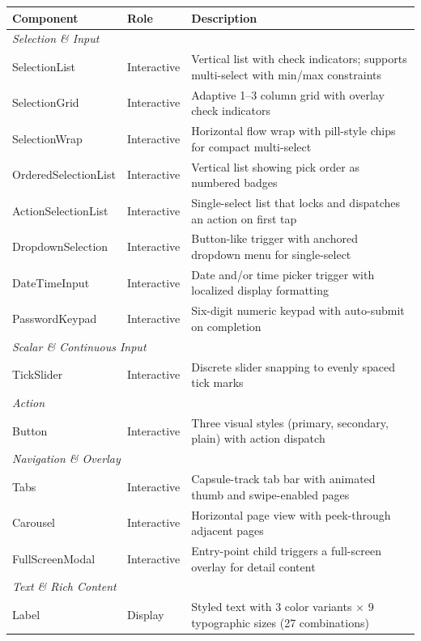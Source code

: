 \begin{table}[h]
\centering

\small
\begin{tabular}{llp{7.2cm}}
\toprule
\textbf{Component} & \textbf{Role} & \textbf{Description} \\
\midrule
\multicolumn{3}{l}{\textit{Selection \& Input}} \\
SelectionList & Interactive & Vertical list with check indicators; supports multi-select with min/max constraints \\
SelectionGrid & Interactive & Adaptive 1--3 column grid with overlay check indicators \\
SelectionWrap & Interactive & Horizontal flow wrap with pill-style chips for compact multi-select \\
OrderedSelectionList & Interactive & Vertical list showing pick order as numbered badges \\
ActionSelectionList & Interactive & Single-select list that locks and dispatches an action on first tap \\
DropdownSelection & Interactive & Button-like trigger with anchored dropdown menu for single-select \\
DateTimeInput & Interactive & Date and/or time picker trigger with localized display formatting \\
PasswordKeypad & Interactive & Six-digit numeric keypad with auto-submit on completion \\
\midrule
\multicolumn{3}{l}{\textit{Scalar \& Continuous Input}} \\
TickSlider & Interactive & Discrete slider snapping to evenly spaced tick marks \\
\midrule
\multicolumn{3}{l}{\textit{Action}} \\
Button & Interactive & Three visual styles (primary, secondary, plain) with action dispatch \\
\midrule
\multicolumn{3}{l}{\textit{Navigation \& Overlay}} \\
Tabs & Interactive & Capsule-track tab bar with animated thumb and swipe-enabled pages \\
Carousel & Interactive & Horizontal page view with peek-through adjacent pages \\
FullScreenModal & Interactive & Entry-point child triggers a full-screen overlay for detail content \\
\midrule
\multicolumn{3}{l}{\textit{Text \& Rich Content}} \\
Label & Display & Styled text with 3 color variants $\times$ 9 typographic sizes (27 combinations) \\

\end{tabular}
\end{table}
